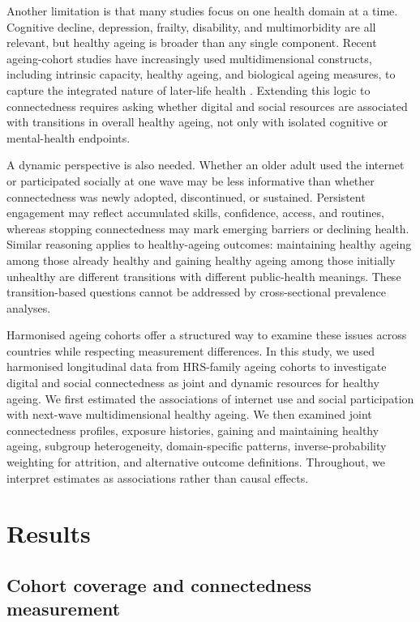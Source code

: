 \documentclass[pdflatex,sn-nature]{sn-jnl}
\begin{document}
Another limitation is that many studies focus on one health domain at a time. Cognitive decline, depression, frailty, disability, and multimorbidity are all relevant, but healthy ageing is broader than any single component. Recent ageing-cohort studies have increasingly used multidimensional constructs, including intrinsic capacity, healthy ageing, and biological ageing measures, to capture the integrated nature of later-life health \cite{li2026intrinsic,beard2024cohort,mikkola2023healthy,sayed2021inflammatory}. Extending this logic to connectedness requires asking whether digital and social resources are associated with transitions in overall healthy ageing, not only with isolated cognitive or mental-health endpoints.

A dynamic perspective is also needed. Whether an older adult used the internet or participated socially at one wave may be less informative than whether connectedness was newly adopted, discontinued, or sustained. Persistent engagement may reflect accumulated skills, confidence, access, and routines, whereas stopping connectedness may mark emerging barriers or declining health. Similar reasoning applies to healthy-ageing outcomes: maintaining healthy ageing among those already healthy and gaining healthy ageing among those initially unhealthy are different transitions with different public-health meanings. These transition-based questions cannot be addressed by cross-sectional prevalence analyses.

Harmonised ageing cohorts offer a structured way to examine these issues across countries while respecting measurement differences. In this study, we used harmonised longitudinal data from HRS-family ageing cohorts to investigate digital and social connectedness as joint and dynamic resources for healthy ageing. We first estimated the associations of internet use and social participation with next-wave multidimensional healthy ageing. We then examined joint connectedness profiles, exposure histories, gaining and maintaining healthy ageing, subgroup heterogeneity, domain-specific patterns, inverse-probability weighting for attrition, and alternative outcome definitions. Throughout, we interpret estimates as associations rather than causal effects.

\section{Results}

\subsection{Cohort coverage and connectedness measurement}
\end{document}
